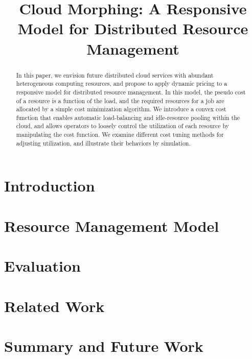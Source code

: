 \documentclass[10pt,sigconf,letterpaper,anonymous,nonacm]{acmart}
\title{Cloud Morphing: A Responsive Model for Distributed Resource Management}
\begin{document}
\begin{abstract}

In this paper, we envision future distributed cloud services with
abundant heterogeneous computing resources,
and propose to apply dynamic pricing to a responsive model for
distributed resource management.
In this model, the pseudo cost of a resource is a function of the
load, and the required resources for a job are allocated by a simple
cost minimization algorithm.
We introduce a convex cost function that enables automatic
load-balancing and idle-resource pooling within the cloud, and allows
operators to loosely control the utilization of each resource by
manipulating the cost function. We examine different cost tuning
methods for adjusting utilization, and illustrate their behaviors by
simulation.

\end{abstract}

\maketitle

\section{Introduction}



\section{Resource Management Model}



\section{Evaluation}



\section{Related Work}



\section{Summary and Future Work}





\end{document}
